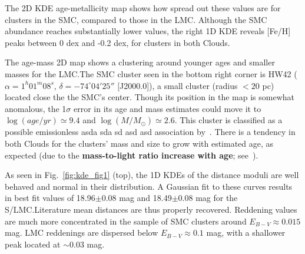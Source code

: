 \documentclass{aa}
\begin{document}
The 2D KDE age-metallicity map shows how spread out these values are for
clusters in the SMC, compared to those in the LMC.\@
Although the SMC abundance reaches substantially lower values, the right 1D KDE
reveals [Fe/H] peaks between 0 dex and -0.2 dex, for clusters in both Clouds.

The age-mass 2D map shows a clustering around younger ages and smaller masses
for the LMC.\@ The SMC cluster seen in the bottom right corner is HW42
($\alpha{=}1^h01^m08^s$, $\delta{=}-74^\circ04'25''$ [J2000.0]),
a small cluster (radius ${<}20$ pc) located close the the SMC's center. Though
its position in the map is somewhat anomalous, the 1$\sigma$ error in its age
and mass estimates could move it to $\log(age/yr){\simeq}9.4$ and $\log(M/M_
{\odot}){\simeq}2.6$. This cluster is classified as a possible emissionless
asda sda sd asd asd association by~\cite{Bica_1995}.
%
There is a tendency in both Clouds for the clusters' mass and size to
grow with estimated age, as expected (due to the \textbf{mass-to-light ratio
increase with age}; see~\citealp[][Sect. 4]{Popescu_2012}).

As seen in Fig.~\ref{fig:kde_fig1} (top), the 1D KDEs of the distance
moduli are well behaved and normal in their distribution.
A Gaussian fit to these curves results in best fit values of 18.96$\pm$0.08 mag
and 18.49$\pm$0.08 mag for the S/LMC.\@ Literature mean distances are thus
properly recovered.
%
Reddening values are much more concentrated in the sample of SMC clusters
around $E_{B-V}{\approx}0.015$ mag. LMC reddenings are dispersed below $E_{B-V}
{\approx}0.1$ mag, with a shallower peak located at ${\sim}0.03$ mag.




\end{document}
